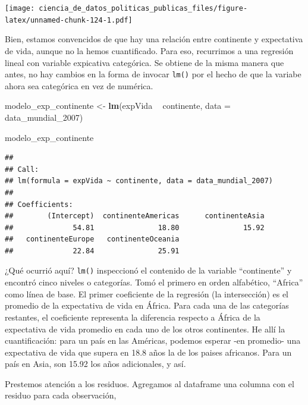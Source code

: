 \documentclass[]{book}
\newenvironment{Shaded}{\begin{snugshade}}{\end{snugshade}}
\newcommand{\KeywordTok}[1]{\textcolor[rgb]{0.13,0.29,0.53}{\textbf{#1}}}
\newcommand{\DataTypeTok}[1]{\textcolor[rgb]{0.13,0.29,0.53}{#1}}
\newcommand{\DecValTok}[1]{\textcolor[rgb]{0.00,0.00,0.81}{#1}}
\newcommand{\StringTok}[1]{\textcolor[rgb]{0.31,0.60,0.02}{#1}}
\newcommand{\OperatorTok}[1]{\textcolor[rgb]{0.81,0.36,0.00}{\textbf{#1}}}
\newcommand{\NormalTok}[1]{#1}
\begin{document}
\texttt{[image: ciencia\_de\_datos\_politicas\_publicas\_files/figure-latex/unnamed-chunk-124-1.pdf]}

Bien, estamos convencidos de que hay una relación entre continente y
expectativa de vida, aunque no la hemos cuantificado. Para eso,
recurrimos a una regresión lineal con variable expicativa categórica. Se
obtiene de la misma manera que antes, no hay cambios en la forma de
invocar \texttt{lm()} por el hecho de que la variabe ahora sea
categórica en vez de numérica.

\begin{Shaded}
\begin{Highlighting}[]
\NormalTok{modelo_exp_continente <-}\StringTok{ }\KeywordTok{lm}\NormalTok{(expVida }\OperatorTok{~}\StringTok{ }\NormalTok{continente, }\DataTypeTok{data =}\NormalTok{ data_mundial_}\DecValTok{2007}\NormalTok{)}


\NormalTok{modelo_exp_continente}
\end{Highlighting}
\end{Shaded}

\begin{verbatim}
## 
## Call:
## lm(formula = expVida ~ continente, data = data_mundial_2007)
## 
## Coefficients:
##        (Intercept)  continenteAmericas      continenteAsia  
##              54.81               18.80               15.92  
##   continenteEurope   continenteOceania  
##              22.84               25.91
\end{verbatim}

¿Qué ocurrió aquí? \texttt{lm()} inspeccionó el contenido de la variable
``continente'' y encontró cinco niveles o categorías. Tomó el primero en
orden alfabético, ``Africa'' como línea de base. El primer coeficiente
de la regresión (la intersección) es el promedio de la expectativa de
vida en África. Para cada una de las categorías restantes, el
coeficiente representa la diferencia respecto a África de la expectativa
de vida promedio en cada uno de los otros continentes. He allí la
cuantificación: para un país en las Américas, podemos esperar -en
promedio- una expectativa de vida que supera en 18.8 años la de los
paises africanos. Para un país en Asia, son 15.92 los años adicionales,
y así.

Prestemos atención a los residuos. Agregamos al dataframe una columna
con el residuo para cada observación,

\begin{Shaded}
\end{Shaded}
\end{document}
